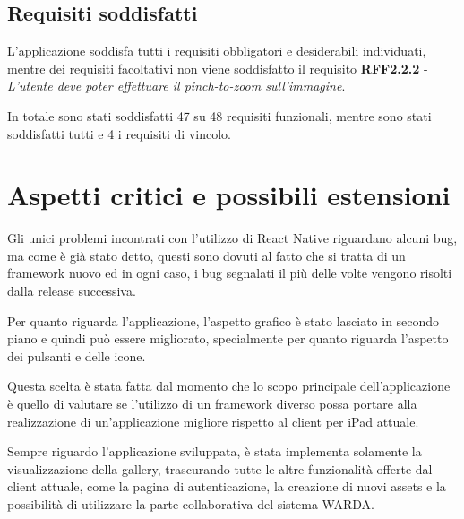 
\subsection{Requisiti soddisfatti}

L'applicazione soddisfa tutti i requisiti obbligatori e desiderabili individuati, mentre dei requisiti facoltativi non viene soddisfatto il requisito
\textbf{RFF2.2.2} - \textit{L'utente deve poter effettuare il pinch-to-zoom sull'immagine}.

In totale sono stati soddisfatti 47 su 48 requisiti funzionali, mentre sono stati soddisfatti tutti e 4 i requisiti di vincolo.

\section{Aspetti critici e possibili estensioni}

Gli unici problemi incontrati con l'utilizzo di React Native riguardano alcuni bug, ma come è già stato detto, questi sono dovuti al fatto che si tratta di un framework nuovo ed in ogni caso, i bug segnalati il più delle volte vengono risolti dalla release successiva.

Per quanto riguarda l'applicazione, l'aspetto grafico è stato lasciato in secondo piano e quindi può essere migliorato, specialmente per quanto riguarda l'aspetto dei pulsanti e delle icone.

Questa scelta è stata fatta dal momento che lo scopo principale dell'applicazione è quello di valutare se l'utilizzo di un framework diverso possa portare alla realizzazione di un'applicazione migliore rispetto al client per iPad attuale.


Sempre riguardo l'applicazione sviluppata, è stata implementa solamente la visualizzazione della gallery, trascurando tutte le altre funzionalità offerte dal client attuale, come la pagina di autenticazione, la creazione di nuovi assets e la possibilità di utilizzare la parte collaborativa del sistema WARDA.


